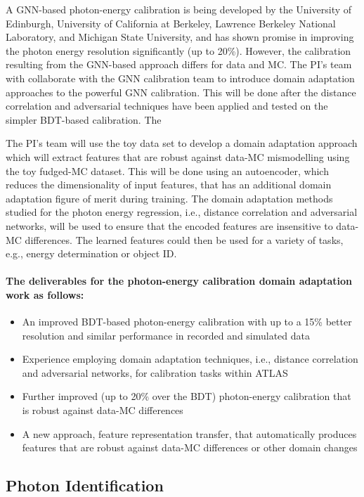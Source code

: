 \documentclass[letter, USenglish, 11pt, subfigure]{article}
\begin{document}
A GNN-based photon-energy calibration is being developed by the University of Edinburgh, University of California at Berkeley, Lawrence Berkeley National Laboratory, and Michigan State University, and has shown promise in improving the photon energy resolution significantly (up to 20\%). However, the calibration resulting from the GNN-based approach differs for data and MC. The PI's team with collaborate with the GNN calibration team to introduce domain adaptation approaches to the powerful GNN calibration. This will be done after the distance correlation and adversarial techniques have been applied and tested on the simpler BDT-based calibration. The 

The PI's team will use the toy data set to develop a domain adaptation approach which will extract features that are robust against data-MC mismodelling using the toy fudged-MC dataset. This will be done using an autoencoder, which reduces the dimensionality of input features, that has an additional domain adaptation figure of merit during training. The domain adaptation methods studied for the photon energy regression, i.e., distance correlation and adversarial networks, will be used to ensure that the encoded features are insensitive to data-MC differences. The learned features could then be used for a variety of tasks, e.g., energy determination or object ID.

\paragraph{The deliverables for the photon-energy calibration domain adaptation work as follows:}
\begin{itemize}
\item An improved BDT-based photon-energy calibration with up to a 15\% better resolution and similar performance in recorded and simulated data
\item Experience employing domain adaptation techniques, i.e., distance correlation and adversarial networks, for calibration tasks within ATLAS
\item Further improved (up to 20\% over the BDT) photon-energy calibration that is robust against data-MC differences
\item A new approach, feature representation transfer, that automatically produces features that are robust against data-MC differences or other domain changes
\end{itemize}

\subsection{Photon Identification}
\end{document}

